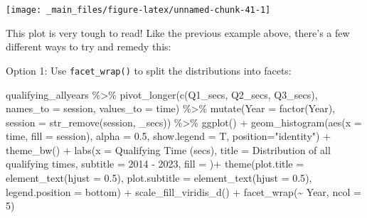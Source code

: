 \documentclass[
]{book}
\newenvironment{Shaded}{\begin{snugshade}}{\end{snugshade}}
\newcommand{\AttributeTok}[1]{\textcolor[rgb]{0.77,0.63,0.00}{#1}}
\newcommand{\DecValTok}[1]{\textcolor[rgb]{0.00,0.00,0.81}{#1}}
\newcommand{\FloatTok}[1]{\textcolor[rgb]{0.00,0.00,0.81}{#1}}
\newcommand{\FunctionTok}[1]{\textcolor[rgb]{0.00,0.00,0.00}{#1}}
\newcommand{\NormalTok}[1]{#1}
\newcommand{\SpecialCharTok}[1]{\textcolor[rgb]{0.00,0.00,0.00}{#1}}
\newcommand{\StringTok}[1]{\textcolor[rgb]{0.31,0.60,0.02}{#1}}
\begin{document}
\begin{center}\texttt{[image: \_main\_files/figure-latex/unnamed-chunk-41-1]} \end{center}

This plot is very tough to read! Like the previous example above, there's a few different ways to try and remedy this:

Option 1: Use \texttt{facet\_wrap()} to split the distributions into facets:

\begin{Shaded}
\begin{Highlighting}[]
\NormalTok{qualifying\_allyears }\SpecialCharTok{\%\textgreater{}\%}
  \FunctionTok{pivot\_longer}\NormalTok{(}\FunctionTok{c}\NormalTok{(}\StringTok{\textquotesingle{}Q1\_secs\textquotesingle{}}\NormalTok{, }\StringTok{\textquotesingle{}Q2\_secs\textquotesingle{}}\NormalTok{, }\StringTok{\textquotesingle{}Q3\_secs\textquotesingle{}}\NormalTok{),}
               \AttributeTok{names\_to =} \StringTok{\textquotesingle{}session\textquotesingle{}}\NormalTok{,}
               \AttributeTok{values\_to =} \StringTok{\textquotesingle{}time\textquotesingle{}}\NormalTok{) }\SpecialCharTok{\%\textgreater{}\%}
  \FunctionTok{mutate}\NormalTok{(}\AttributeTok{Year =} \FunctionTok{factor}\NormalTok{(Year),}
         \AttributeTok{session =} \FunctionTok{str\_remove}\NormalTok{(session, }\StringTok{\textquotesingle{}\_secs\textquotesingle{}}\NormalTok{)) }\SpecialCharTok{\%\textgreater{}\%}
  \FunctionTok{ggplot}\NormalTok{() }\SpecialCharTok{+}
  \FunctionTok{geom\_histogram}\NormalTok{(}\FunctionTok{aes}\NormalTok{(}\AttributeTok{x =}\NormalTok{ time, }\AttributeTok{fill =}\NormalTok{ session),}
                 \AttributeTok{alpha =} \FloatTok{0.5}\NormalTok{, }\AttributeTok{show.legend =}\NormalTok{ T,}
                 \AttributeTok{position=}\StringTok{"identity"}\NormalTok{) }\SpecialCharTok{+}
  \FunctionTok{theme\_bw}\NormalTok{() }\SpecialCharTok{+}
  \FunctionTok{labs}\NormalTok{(}\AttributeTok{x =} \StringTok{\textquotesingle{}Qualifying Time (secs)\textquotesingle{}}\NormalTok{,}
       \AttributeTok{title =} \StringTok{\textquotesingle{}Distribution of all qualifying times\textquotesingle{}}\NormalTok{,}
       \AttributeTok{subtitle =} \StringTok{\textquotesingle{}2014 {-} 2023\textquotesingle{}}\NormalTok{,}
       \AttributeTok{fill =} \StringTok{\textquotesingle{}\textquotesingle{}}\NormalTok{)}\SpecialCharTok{+}
  \FunctionTok{theme}\NormalTok{(}\AttributeTok{plot.title =} \FunctionTok{element\_text}\NormalTok{(}\AttributeTok{hjust =} \FloatTok{0.5}\NormalTok{),}
        \AttributeTok{plot.subtitle =} \FunctionTok{element\_text}\NormalTok{(}\AttributeTok{hjust =} \FloatTok{0.5}\NormalTok{),}
        \AttributeTok{legend.position =} \StringTok{\textquotesingle{}bottom\textquotesingle{}}\NormalTok{) }\SpecialCharTok{+}
  \FunctionTok{scale\_fill\_viridis\_d}\NormalTok{() }\SpecialCharTok{+}
  \FunctionTok{facet\_wrap}\NormalTok{(}\SpecialCharTok{\textasciitilde{}}\NormalTok{ Year, }\AttributeTok{ncol =} \DecValTok{5}\NormalTok{)}
\end{Highlighting}
\end{Shaded}
\end{document}
